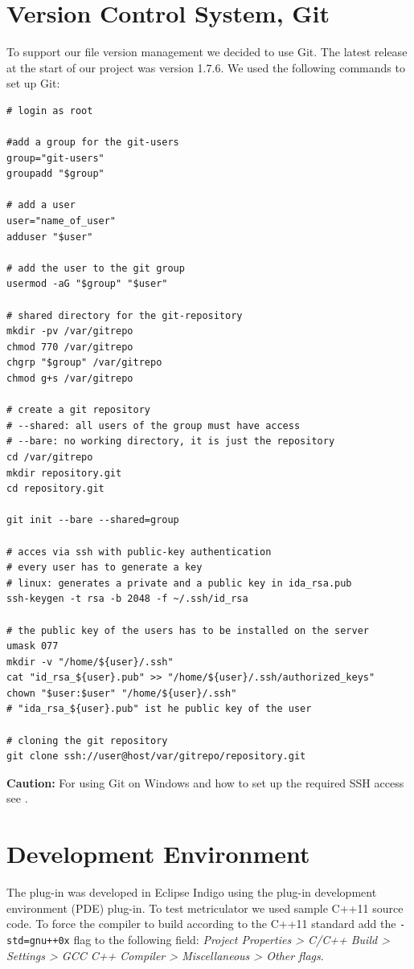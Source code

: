 \documentclass[11pt,a4paper,oneside]{scrreprt}
\begin{document}
\section{Version Control System, Git}
To support our file version management we decided to use Git. The latest release at the start of our project was version 1.7.6. We used the following commands to set up Git:
\begin{lstlisting}[style=console, caption=Git repository set up]
# login as root

#add a group for the git-users 
group="git-users"
groupadd "$group"

# add a user
user="name_of_user"
adduser "$user"

# add the user to the git group
usermod -aG "$group" "$user"

# shared directory for the git-repository
mkdir -pv /var/gitrepo
chmod 770 /var/gitrepo
chgrp "$group" /var/gitrepo
chmod g+s /var/gitrepo

# create a git repository
# --shared: all users of the group must have access
# --bare: no working directory, it is just the repository
cd /var/gitrepo
mkdir repository.git
cd repository.git

git init --bare --shared=group

# acces via ssh with public-key authentication
# every user has to generate a key
# linux: generates a private and a public key in ida_rsa.pub
ssh-keygen -t rsa -b 2048 -f ~/.ssh/id_rsa

# the public key of the users has to be installed on the server
umask 077
mkdir -v "/home/${user}/.ssh"
cat "id_rsa_${user}.pub" >> "/home/${user}/.ssh/authorized_keys"
chown "$user:$user" "/home/${user}/.ssh"
# "ida_rsa_${user}.pub" ist he public key of the user

# cloning the git repository
git clone ssh://user@host/var/gitrepo/repository.git
\end{lstlisting}

\textbf{Caution:} For using Git on Windows and how to set up the required SSH access see \cite{wingitsetup}.

\section{Development Environment}\label{devenv}
The plug-in was developed in Eclipse Indigo using the plug-in development environment (PDE) plug-in. To test metriculator we used sample C++11 source code. To force the compiler to build according to the C++11 standard add the \texttt{-std=gnu++0x} flag to the following field: \textit{Project Properties > C/C++ Build > Settings > GCC C++ Compiler > Miscellaneous > Other flags}.
\end{document}
